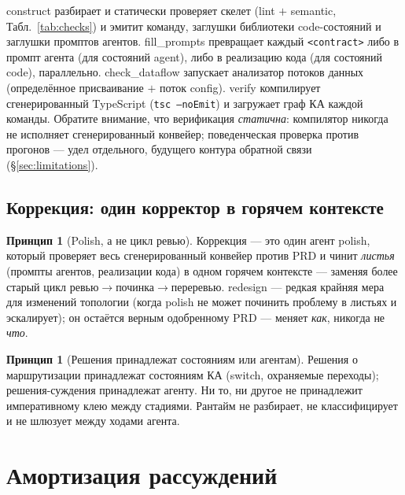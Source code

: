 \documentclass[11pt]{article}
\theoremstyle{plain}
\theoremstyle{definition}
\newtheorem{principle}[theorem]{Принцип}
\theoremstyle{remark}
\newcommand{\code}[1]{\texttt{#1}}
\newcommand{\state}[1]{\textsf{#1}}
\begin{document}
\state{construct} разбирает и статически проверяет скелет (lint $+$ semantic,
Табл.~\ref{tab:checks}) и эмитит команду, заглушки библиотеки code-состояний и заглушки
промптов агентов. \state{fill\_prompts} превращает каждый \code{<contract>} либо в промпт
агента (для состояний \state{agent}), либо в реализацию кода (для состояний \state{code}),
параллельно. \state{check\_dataflow} запускает анализатор потоков данных (определённое
присваивание $+$ поток config). \state{verify} компилирует сгенерированный TypeScript
(\code{tsc --noEmit}) и загружает граф КА каждой команды. Обратите внимание, что
верификация \emph{статична}: компилятор никогда не исполняет сгенерированный конвейер;
поведенческая проверка против прогонов --- удел отдельного, будущего контура обратной
связи (\S\ref{sec:limitations}).

\subsection{Коррекция: один корректор в горячем контексте}\label{sec:lint}

\begin{principle}[Polish, а не цикл ревью]\label{prin:polish}
Коррекция --- это один агент \state{polish}, который проверяет весь сгенерированный
конвейер против PRD и чинит \emph{листья} (промпты агентов, реализации кода) в одном
горячем контексте --- заменяя более старый цикл ревью$\to$починка$\to$переревью.
\state{redesign} --- редкая крайняя мера для изменений топологии (когда \state{polish} не
может починить проблему в листьях и эскалирует); он остаётся верным одобренному PRD ---
меняет \emph{как}, никогда не \emph{что}.
\end{principle}

\begin{principle}[Решения принадлежат состояниям или агентам]\label{prin:decisions}
Решения о маршрутизации принадлежат состояниям КА (\state{switch}, охраняемые переходы);
решения-суждения принадлежат агенту. Ни то, ни другое не принадлежит императивному клею
между стадиями. Рантайм не разбирает, не классифицирует и не шлюзует между ходами агента.
\end{principle}

\section{Амортизация рассуждений}\label{sec:amortization}
\end{document}
